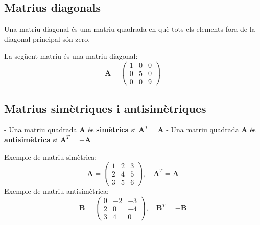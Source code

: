 \documentclass[12pt]{article}
\newcommand{\mat}[1]{\mathbf{#1}}
\begin{document}
\subsection{Matrius diagonals}
\begin{concept}
Una matriu diagonal és una matriu quadrada en què tots els elements fora de la diagonal principal són zero.
\end{concept}

\begin{exemple}
La següent matriu és una matriu diagonal:
\[
\mat{A} = \begin{pmatrix}
1 & 0 & 0 \\
0 & 5 & 0 \\
0 & 0 & 9
\end{pmatrix}
\]
\end{exemple}

\subsection{Matrius simètriques i antisimètriques}
\begin{concept}
- Una matriu quadrada $\mat{A}$ és \textbf{simètrica} si $\mat{A}^T = \mat{A}$
- Una matriu quadrada $\mat{A}$ és \textbf{antisimètrica} si $\mat{A}^T = -\mat{A}$
\end{concept}

\begin{exemple}
Exemple de matriu simètrica:
\[
\mat{A} = \begin{pmatrix}
1 & 2 & 3 \\
2 & 4 & 5 \\
3 & 5 & 6
\end{pmatrix}, \quad \mat{A}^T = \mat{A}
\]
Exemple de matriu antisimètrica:
\[
\mat{B} = \begin{pmatrix}
0 & -2 & -3 \\
2 & 0 & -4 \\
3 & 4 & 0
\end{pmatrix}, \quad \mat{B}^T = -\mat{B}
\]
\end{exemple}
\end{document}
